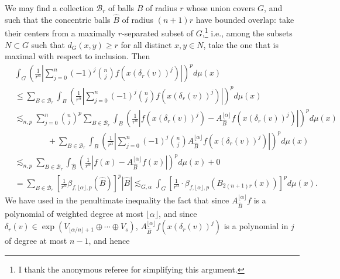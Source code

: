 \documentclass[11pt,reqno]{amsart}
\newcommand{\1}{\mathbf 1}
\begin{document}
We may find a collection $\mathcal{B}_{r}$ of balls $B$ of radius $r$ whose union covers $G$, and such that the concentric balls $\hat{B}$ of radius $\left(n+1\right)r$ have bounded overlap: take their centers from a maximally $r$-separated subset of $G$,\footnote{I thank the anonymous referee for simplifying this argument.} i.e., among the subsets $N\subset G$ such that $d_G\left(x,y\right)\ge r$ for all distinct $x,y\in N$, take the one that is maximal with respect to inclusion. Then
\begin{align*}
&\int_G \left(\frac{1}{r^\alpha}\left|\sum_{j=0}^n \left(-1\right)^j \binom{n}{j}f\left(x\left(\delta_{r}\left(v\right)\right)^j\right)\right| \right)^p d\mu\left(x\right) \\
& \le \sum_{B \in {\mathcal{B}}_{r}}  \int_B \left(\frac{1}{r^\alpha}\left|\sum_{j=0}^n \left(-1\right)^j \binom{n}{j}f\left(x\left(\delta_{r}\left(v\right)\right)^j\right)\right| \right)^p d\mu\left(x\right)\\
& \lesssim_{n,p} \sum_{j=0}^n  \binom{n}{j}^p\sum_{B \in {\mathcal{B}}_{r}}  \int_B \left(\frac{1}{r^\alpha}\left|f\left(x\left(\delta_{r}\left(v\right)\right)^j\right)-A^{\lfloor\alpha\rfloor}_{\hat{B}}f\left(x\left(\delta_{r}\left(v\right)\right)^j\right)\right| \right)^p d\mu\left(x\right)\\
&\qquad\qquad +\sum_{B\in \mathcal{B}_{r}}\int_B \left(\frac{1}{r^\alpha}\left|\sum_{j=0}^n \left(-1\right)^j \binom{n}{j}A^{\lfloor\alpha\rfloor}_{\hat{B}}f\left(x\left(\delta_{r}\left(v\right)\right)^j\right)\right| \right)^p d\mu\left(x\right)\\
&\lesssim_{n,p} \sum_{B \in {\mathcal{B}}_{r}} \int_{\hat{B}} \left(\frac{1}{r^\alpha}\left|f\left(x\right)-A^{\lfloor\alpha\rfloor}_{\hat{B}}f\left(x\right)\right| \right)^{p} d\mu\left(x\right)+0\\
&= \sum_{B \in {\mathcal{B}}_{r}} \left[ \frac{1}{r^\alpha} \beta_{f,\lfloor\alpha\rfloor ,p}\left(\hat{B}\right)\right]^{p}\left|\hat{B}\right| \lesssim_{G,\alpha} \int_{G}  \left[\frac{1}{r^\alpha} \cdot \beta_{f,\lfloor\alpha\rfloor,p}\left(B_{2\left(n+1\right)r}\left(x\right)\right)\right]^{p} d\mu\left(x\right).
\end{align*}
We have used in the penultimate inequality the fact that since $A^{\lfloor\alpha\rfloor}_{\hat{B}}f$ is a polynomial of weighted degree at most $\lfloor\alpha\rfloor$, and since $\delta_r\left(v\right)\in \exp\left(V_{\lfloor\alpha/n\rfloor+1}\oplus\cdots\oplus V_s\right)$, $A^{\lfloor\alpha\rfloor}_{\hat{B}}f\left(x\left(\delta_{r}\left(v\right)\right)^j\right)$ is a polynomial in $j$ of degree at most $n-1$, and hence 
\end{document}
